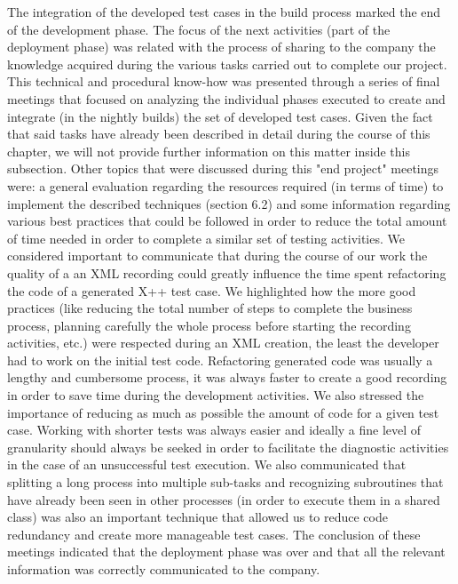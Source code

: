 The integration of the developed test cases in the build process marked the end of the development phase. The focus of the next activities (part of the deployment phase) was related with the process of sharing to the company the knowledge acquired during the various tasks carried out to complete our project. This technical and procedural know-how was presented through a series of final meetings that focused on analyzing the individual phases executed to create and integrate (in the nightly builds) the set of developed test cases. Given the fact that said tasks have already been described in detail during the course of this chapter, we will not provide further information on this matter inside this subsection. Other topics that were discussed during this "end project" meetings were: a general evaluation regarding the resources required (in terms of time) to implement the described techniques (section 6.2) and some information regarding various best practices that could be followed in order to reduce the total amount of time needed in order to complete a similar set of testing activities. We considered important to communicate that during the course of our work the quality of a an XML recording could greatly influence the time spent refactoring the code of a generated X++ test case. We highlighted how the more good practices (like reducing the total number of steps to complete the business process, planning carefully the whole process before starting the recording activities, etc.) were respected during an XML creation, the least the developer had to work on the initial test code. Refactoring generated code was usually a lengthy and cumbersome process, it was always faster to create a good recording in order to save time during the development activities. We also stressed the importance of reducing as much as possible the amount of code for a given test case. Working with shorter tests was always easier and ideally a fine level of granularity should always be seeked in order to facilitate the diagnostic activities in the case of an unsuccessful test execution. We also communicated that splitting a long process into multiple sub-tasks and recognizing subroutines that have already been seen in other processes (in order to execute them in a shared class) was also an important technique that allowed us to reduce code redundancy and create more manageable test cases. 
The conclusion of these meetings indicated that the deployment phase was over and that all the relevant information was correctly communicated to the company.

